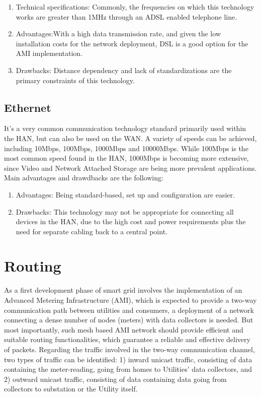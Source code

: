 \documentclass[11pt,final,onecolumn]{IEEEtran}
\begin{document}
\begin{enumerate}

	\item Technical specifications: Commonly, the frequencies on which this technology works are greater than 1MHz through an ADSL enabled telephone line. 
	\item Advantages:With a high data transmission rate, and given the low installation costs for the network deployment, DSL is a good option for the AMI implementation.
	\item Drawbacks: Distance dependency and lack of standardizations are the primary constraints of this technology.
\end{enumerate}

\subsection{Ethernet}\label{ethernetl}

It’s a very common communication technology standard primarily used within the HAN, but can also be used on the WAN. A variety of speeds can be achieved, including 10Mbps, 100Mbps, 1000Mbps and 10000Mbps. While 100Mbps is the most common speed found in the HAN, 1000Mbps is becoming more extensive, since Video and Network Attached Storage are being more prevalent applications. Main advantages and drawdbacks are the following:

\begin{enumerate}
	
	\item Advantages: Being standard-based, set up and configuration are easier.
	\item Drawbacks: This technology may not be appropriate for connecting all devices in the HAN, due to the high cost and power requirements plus the need for separate cabling back to a central point.
\end{enumerate}



\section{Routing} \label{routing}

As a first development phase of smart grid involves the implementation of an Advanced Metering Infrastructure (AMI), which is expected to provide a two-way communication path between utilities and consumers, a deployment of a network connecting a dense number of nodes (meters) with data collectors is needed. But most importantly, such mesh based AMI network should provide efficient and suitable routing functionalities, which guarantee a reliable and effective delivery of packets. Regarding the traffic involved in the two-way communication channel, two types of traffic can be identified: 1) inward unicast traffic, consisting of data containing the meter-reading, going from homes to Utilities’ data collectors, and 2) outward unicast traffic, consisting of data containing data going from collectors to substation or the Utility itself. 
\end{document}
